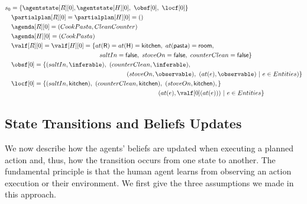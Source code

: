 
{\small
\noindent
\begin{align*}
&s_0 = \{\agentstate[R][0], \agentstate[H][0],~\obsf[0],~\locf[0]\} \\
&\quad \partialplan[R][0] = \partialplan[H][0] = ()\\
&\quad \agenda[R][0] = (CookPasta, CleanCounter)\\
&\quad \agenda[H][0] = (CookPasta)\\
&\quad \valf[R][0] = \valf[H][0] = \{at(\textsf{R}) = at(\textsf{H}) = \textsf{kitchen},~at(\textsf{pasta})=\textsf{room},\\
&\qquad \qquad \qquad \qquad \qquad \qquad \qquad \quad saltIn = \textsf{false},~stoveOn = \textsf{false},~counterClean = \textsf{false}\}\\
&\quad \obsf[0] = \{ (saltIn,\inferable),~(counterClean,\inferable),\\
&\qquad \qquad \qquad \qquad \qquad \qquad \qquad \qquad \qquad \quad \ (stoveOn,\observable),~(at(e),\observable) ~|~ e \in Entities)\}\\
&\quad \locf[0] = \{ (saltIn,\textsf{kitchen}),~(counterClean,\textsf{kitchen}),~(stoveOn,\textsf{kitchen}), \}\\
&\qquad \qquad \qquad \qquad \qquad \qquad \qquad \qquad \qquad \qquad \qquad \qquad \ (at(e),\valf[0](at(e))) ~|~ e \in Entities \}
\end{align*}

    \subsection{State Transitions and Beliefs Updates}

We now describe how the agents' beliefs are updated when executing a planned action and, thus, how the transition occurs from one state to another. The fundamental principle is that the human agent learns from observing an action execution or their environment. We first give the three assumptions we made in this approach.

}
